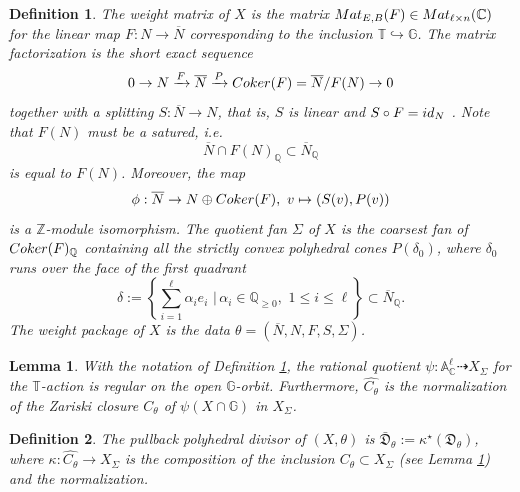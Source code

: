 \documentclass[10pt,a4paper]{amsart}
\newtheorem{definition}{Definition}
\newtheorem{lemma}{Lemma}
\begin{document}
\begin{definition}\label{def-weightpack}
The \emph{weight matrix} of  $X$ is the matrix
${\rm Mat}_{E, B}(F)\in {\rm Mat}_{\ell\times n}(\mathbb{C})$
for the linear map $F: N\rightarrow \overline{N}$ corresponding to the inclusion $\mathbb{T}\hookrightarrow \mathbb{G}$. The \emph{matrix factorization} is the short exact sequence 
$$0\rightarrow N\xrightarrow{F} \overline{N}\xrightarrow{P} {\rm Coker}(F) =  \overline{N}/F(N)\rightarrow 0 $$
together with a splitting $S:\overline{N}\rightarrow N$, that is, $S$ is linear and $S\circ F = {\rm id}_{N}$ . Note that $F(N)$ must be a satured, i.e.
$$\overline{N}\cap F(N)_{\mathbb{Q}}\subset \overline{N}_{\mathbb{Q}}$$ 
is equal to $F(N)$.
Moreover, the map
\begin{equation}\label{Eq:downgraded}
    \phi:\overline{N}\rightarrow N\oplus {\rm Coker}(F),\,\, v\mapsto (S(v), P(v))
\end{equation}
is a $\mathbb{Z}$-module isomorphism. The \emph{quotient fan} $\Sigma$ of $X$ is the coarsest fan of ${\rm Coker}(F)_{\mathbb{Q}}$ containing all the strictly convex polyhedral cones $P(\delta_0)$, where $\delta_{0}$ runs over the face of the 
first quadrant 
$$ \delta:= \left\{ \sum_{i = 1}^{\ell}\alpha_{i} e_{i}\, \, |\, \alpha_{i}\in \mathbb{Q}_{\geq 0}, \,\, 1\leq i\leq \ell\right\}\subset \overline{N}_{\mathbb{Q}}.$$
The \emph{weight package} of $X$ is the data $\theta =  (\overline{N}, N, F, S, \Sigma)$.
\end{definition}

\begin{lemma}\label{lem-Ctheta-Ctheta}
With the notation of Definition \ref{def-weightpack}, the rational quotient $\psi: \mathbb{A}_{\mathbb{C}}^{\ell}\dashrightarrow X_{\Sigma}$
for the $\mathbb{T}$-action is regular on the open $\mathbb{G}$-orbit. Furthermore, $\widehat{C_{\theta}}$ is the normalization of the Zariski closure $C_{\theta}$ of $\psi(X\cap \mathbb{G})$ in $X_{\Sigma}$. 
\end{lemma}

\begin{definition}\label{def-pullbackpol}
The \emph{pullback polyhedral divisor of $(X, \theta)$} is 
$\bar{\mathfrak{D}}_{\theta}:= \kappa^{\star}(\mathfrak{D}_{\theta})$, where $\kappa: \widehat{C_{\theta}}\rightarrow X_{\Sigma}$ is the composition of the inclusion $C_{\theta}\subset X_{\Sigma}$ (see Lemma \ref{lem-Ctheta-Ctheta}) and the normalization. 
\end{definition}
\end{document}
